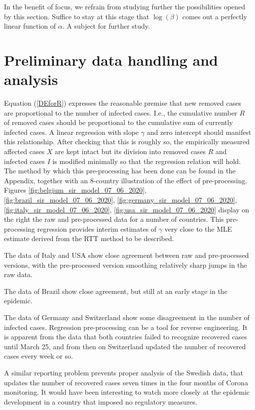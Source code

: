 \documentclass{article}
\begin{document}
	In the benefit of focus, we refrain from studying further the possibilities opened by this section. Suffice to stay at this stage that $\log(\beta)$ comes out a perfectly linear function of $\alpha$. A subject for further study.
	
\section{Preliminary data handling and analysis} \label{preliminarysection}

Equation (\ref{DEforR}) expresses the reasonable premise that new removed cases are proportional to the number of infected cases. I.e., the cumulative number $R$ of removed cases should be proportional to the cumulative sum of currently infected cases. A linear regression with slope $\gamma$ and zero intercept should manifest this relationship. After checking that this is roughly so, the empirically measured affected cases $X$ are kept intact but its division into removed cases $R$ and infected cases $I$ is modified minimally so that the regression relation will hold. The method by which this pre-processing has been done can be found in the Appendix, together with an 8-country illustration of the effect of pre-processing. Figures \ref{fig:belgium_sir_model_07_06_2020}, \ref{fig:brazil_sir_model_07_06_2020}, \ref{fig:germany_sir_model_07_06_2020}, \ref{fig:italy_sir_model_07_06_2020}, \ref{fig:usa_sir_model_07_06_2020} display on the right the raw and pre-processed data for a number of countries. This pre-processing regression provides interim estimates of $\gamma$ very close to the MLE estimate derived from the RTT method to be described.

The data of Italy and USA show close agreement between raw and pre-processed versions, with the pre-processed version smoothing relatively sharp jumps in the raw data.

The data of Brazil show close agreement, but still at an early stage in the epidemic.

The data of Germany and Switzerland show some disagreement in the number of infected cases. Regression pre-processing can be a tool for reverse engineering. It is apparent from the data that both countries failed to recognize recovered cases until March 25, and from then on Switzerland updated the number of recovered cases every week or so.

A similar reporting problem prevents proper analysis of the Swedish data, that updates the number of recovered cases seven times in the four months of Corona monitoring. It would have been interesting to watch more closely at the epidemic development in a country that imposed no regulatory measures.
\end{document}
